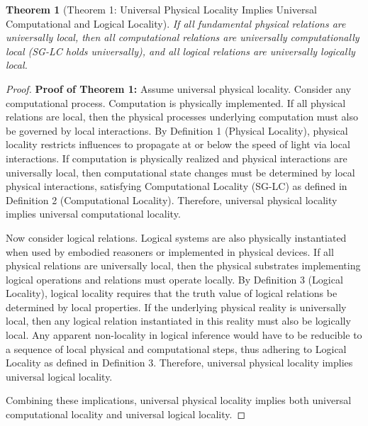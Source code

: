 \documentclass{article}
\newtheorem{theorem}{Theorem}
\begin{document}
	\begin{theorem}[Theorem 1: Universal Physical Locality Implies Universal Computational and Logical Locality]
		If all fundamental physical relations are universally local, then all computational relations are universally computationally local (SG-LC holds universally), and all logical relations are universally logically local.
	\end{theorem}
	\begin{proof}
		\textbf{Proof of Theorem 1:} Assume universal physical locality. Consider any computational process. Computation is physically implemented. If all physical relations are local, then the physical processes underlying computation must also be governed by local interactions. By Definition 1 (Physical Locality), physical locality restricts influences to propagate at or below the speed of light via local interactions. If computation is physically realized and physical interactions are universally local, then computational state changes must be determined by local physical interactions, satisfying Computational Locality (SG-LC) as defined in Definition 2 (Computational Locality). Therefore, universal physical locality implies universal computational locality.

		Now consider logical relations. Logical systems are also physically instantiated when used by embodied reasoners or implemented in physical devices. If all physical relations are universally local, then the physical substrates implementing logical operations and relations must operate locally. By Definition 3 (Logical Locality), logical locality requires that the truth value of logical relations be determined by local properties. If the underlying physical reality is universally local, then any logical relation instantiated in this reality must also be logically local. Any apparent non-locality in logical inference would have to be reducible to a sequence of local physical and computational steps, thus adhering to Logical Locality as defined in Definition 3. Therefore, universal physical locality implies universal logical locality.

		Combining these implications, universal physical locality implies both universal computational locality and universal logical locality.
	\end{proof}
\end{document}
